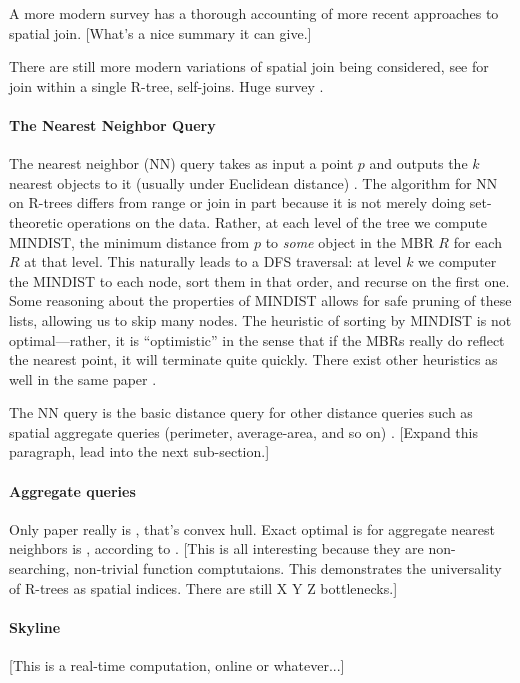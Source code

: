 A more modern survey \cite{jacoxsamet07} has a thorough accounting of more recent approaches to spatial join.
[What's a nice summary it can give.]

There are still more modern variations of spatial join being considered, see \cite{vassilakopouloscorralkaranikolas11} for join within a single R-tree, self-joins.
Huge survey \cite{jacoxsamet07}.

\paragraph{The Nearest Neighbor Query}
The nearest neighbor (NN) query takes as input a point $p$ and outputs the $k$ nearest objects to it (usually under Euclidean distance) \cite{roussopouloskelleyvincent95}.
The algorithm for NN on R-trees differs from range or join in part because it is not merely doing set-theoretic operations on the data. 
Rather, at each level of the tree we compute MINDIST, the minimum distance from $p$ to \emph{some} object in the MBR $R$ for each $R$ at that level.
This naturally leads to a DFS traversal: at level $k$ we computer the MINDIST to each node, sort them in that order, and recurse on the first one.
Some reasoning about the properties of MINDIST allows for safe pruning of these lists, allowing us to skip many nodes.
The heuristic of sorting by MINDIST is not optimal---rather, it is ``optimistic'' in the sense that if the MBRs really do reflect the nearest point, it will terminate quite quickly.
There exist other heuristics as well in the same paper \cite{roussopouloskelleyvincent95}.

The NN query is the basic distance query for other distance queries such as spatial aggregate queries (perimeter, average-area, and so on) \cite{corralalmendros-jimenez07}.
[Expand this paragraph, lead into the next sub-section.]

\paragraph{Aggregate queries}
Only paper really is \cite{bohmkriegel01}, that's convex hull.
Exact optimal is for aggregate nearest neighbors is \cite{papadiastaomouratidishui05}, according to \cite{liliyiyaowang11}.
[This is all interesting because they are non-searching, non-trivial function comptutaions.
This demonstrates the universality of R-trees as spatial indices.
There are still X Y Z bottlenecks.]
 
\paragraph{Skyline}
[This is a real-time computation, online or whatever...]

